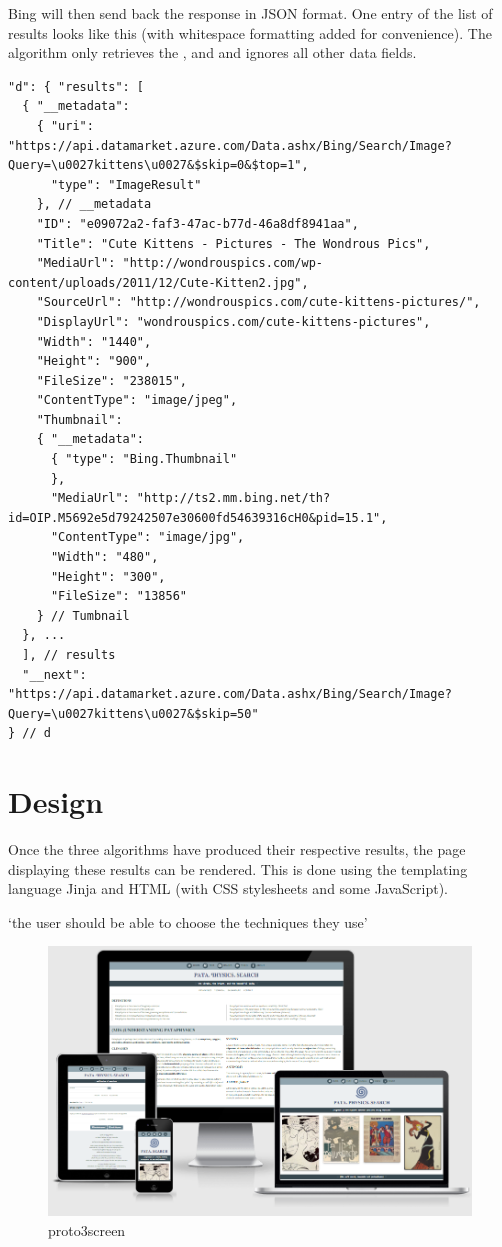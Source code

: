 Bing will then send back the response in \ac{JSON} format. One entry of the list of results looks like this (with whitespace formatting added for convenience). The algorithm only retrieves the ,  and  and ignores all other data fields.

\begin{verbatim}
"d": { "results": [
  { "__metadata":
    { "uri": "https://api.datamarket.azure.com/Data.ashx/Bing/Search/Image?Query=\u0027kittens\u0027&$skip=0&$top=1",
      "type": "ImageResult"
    }, // __metadata
    "ID": "e09072a2-faf3-47ac-b77d-46a8df8941aa",
    "Title": "Cute Kittens - Pictures - The Wondrous Pics",
    "MediaUrl": "http://wondrouspics.com/wp-content/uploads/2011/12/Cute-Kitten2.jpg",
    "SourceUrl": "http://wondrouspics.com/cute-kittens-pictures/",
    "DisplayUrl": "wondrouspics.com/cute-kittens-pictures",
    "Width": "1440",
    "Height": "900",
    "FileSize": "238015",
    "ContentType": "image/jpeg",
    "Thumbnail":
    { "__metadata":
      { "type": "Bing.Thumbnail"
      },
      "MediaUrl": "http://ts2.mm.bing.net/th?id=OIP.M5692e5d79242507e30600fd54639316cH0&pid=15.1",
      "ContentType": "image/jpg",
      "Width": "480",
      "Height": "300",
      "FileSize": "13856"
    } // Tumbnail
  }, ...
  ], // results
  "__next": "https://api.datamarket.azure.com/Data.ashx/Bing/Search/Image?Query=\u0027kittens\u0027&$skip=50"
} // d
\end{verbatim}


\section{Design}

Once the three algorithms have produced their respective results, the page displaying these results can be rendered. This is done using the templating language Jinja and \ac{HTML} (with \ac{CSS} stylesheets and some JavaScript).

`the user should be able to choose the techniques they use' \autocite{Hendler2011}


\begin{figure}[!htbp] %
  \centering
  \includegraphics[width=\linewidth]{images/proto3screen}
\caption[proto3screen]{proto3screen}
\label{img:proto3screen}
\end{figure}

